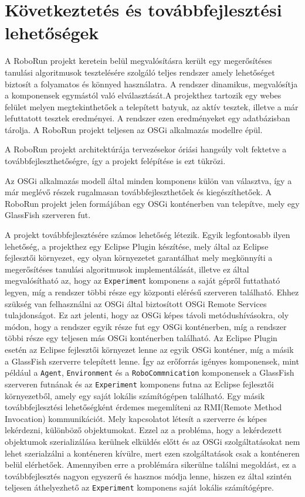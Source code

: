 \chapter{Következtetés és továbbfejlesztési lehetőségek}\label{ch:KOVETKEZTETESEK}

A RoboRun projekt keretein belül megvalósításra került egy megerősítéses tanulási algoritmusok tesztelésére szolgáló teljes rendszer amely lehetőséget biztosít a folyamatos és könnyed használatra. A rendszer dinamikus, megvalósítja a komponensek egymástól való elválasztását.A projekthez tartozik egy webes felület melyen megtekinthetőek a telepített batyuk, az aktív tesztek, illetve a már lefuttatott tesztek eredményei. A rendszer ezen eredményeket egy adatbázisban tárolja. A RoboRun projekt teljesen az OSGi alkalmazás modellre épül.

A RoboRun projekt architektúrája tervezésekor óriási hangsúly volt fektetve a továbbfejleszthetőségre, így a projekt felépítése is ezt tükrözi.

Az OSGi alkalmazás modell által minden komponens külön van választva, így a már meglévő részek rugalmasan továbbfejleszthetőek és kiegészíthetőek. A RoboRun projekt jelen formájában egy OSGi konténerben van telepítve, mely egy GlassFish szerveren fut.

A projekt továbbfejlesztésére számos lehetőség létezik. Egyik legfontosabb ilyen lehetőség, a projekthez egy Eclipse Plugin\cite{eclipseplugin} készítése, mely által az Eclipse fejlesztői környezet, egy olyan környezetet garantálhat mely megkönnyíti a megerősítéses tanulási algoritmusok implementálását, illetve ez által megvalósítható az, hogy az \texttt{Experiment} komponens a saját gépről futtatható legyen, míg a rendszer többi része egy központi elérésű szerveren található. Ehhez szükség van felhasználni az OSGi által biztosított OSGi Remote Services tulajdonságot. Ez azt jelenti, hogy az OSGi képes távoli metódushívásokra, oly módon, hogy a rendszer egyik része fut egy OSGi konténerben, míg a rendszer többi része  egy teljesen más OSGi konténerben található. Az Eclipse Plugin esetén az Eclipse fejlesztői környezet lenne az egyik OSGi konténer, míg a másik a GlassFish szerverre telepített lenne. Így az erőforrás igényes komponensek, mint például a \texttt{Agent}, \texttt{Environment} és a \texttt{RoboCommnication} komponensek a GlassFish szerveren futnának és az \texttt{Experiment} komponens futna az Eclipse fejlesztői környezetből, amely egy saját lokális számítógépen található. 
Egy másik továbbfejlesztési lehetőségként érdemes megemlíteni az RMI(Remote Method Invocation) kommunikációt. Mely kapcsolatot létesít a szerverre és képes lekérdezni, különböző objektumokat. Ezzel az a probléma, hogy a lekérdezett objektumok szerializálása kerülnek elküldés előtt és az OSGi szolgáltatásokat nem lehet szerialzálni a konténeren kívülre, mert ezen szolgáltatások csak a konténeren belül elérhetőek. Amennyiben erre a problémára sikerülne találni megoldást, ez a továbbfejlesztés nagyon egyszerű és hasznos módja lenne, hiszen ez által szintén teljesen áthelyezhető az \texttt{Experiment} komponens saját lokális számítógépre.

